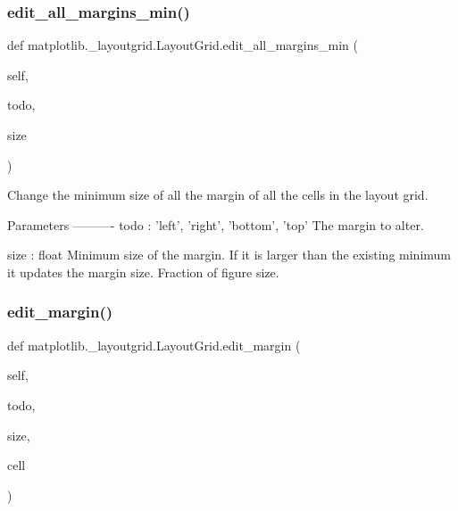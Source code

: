 \subsubsection{\texorpdfstring{edit\+\_\+all\+\_\+margins\+\_\+min()}{edit\_all\_margins\_min()}}
{\footnotesize\ttfamily def matplotlib.\+\_\+layoutgrid.\+Layout\+Grid.\+edit\+\_\+all\+\_\+margins\+\_\+min (\begin{DoxyParamCaption}\item[{}]{self,  }\item[{}]{todo,  }\item[{}]{size }\end{DoxyParamCaption})}

\begin{DoxyVerb}Change the minimum size of all the margin of all
the cells in the layout grid.

Parameters
----------
todo : {'left', 'right', 'bottom', 'top'}
    The margin to alter.

size : float
    Minimum size of the margin.  If it is larger than the
    existing minimum it updates the margin size. Fraction of
    figure size.
\end{DoxyVerb}
 \mbox{\label{classmatplotlib_1_1__layoutgrid_1_1LayoutGrid_a55d3f9acc64853dd72dc6a9bfe4b73e7}} 
\subsubsection{\texorpdfstring{edit\+\_\+margin()}{edit\_margin()}}
{\footnotesize\ttfamily def matplotlib.\+\_\+layoutgrid.\+Layout\+Grid.\+edit\+\_\+margin (\begin{DoxyParamCaption}\item[{}]{self,  }\item[{}]{todo,  }\item[{}]{size,  }\item[{}]{cell }\end{DoxyParamCaption})}

